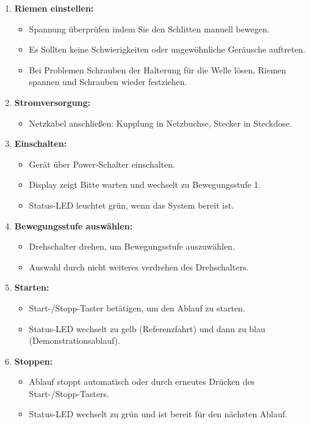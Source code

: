 \documentclass[12pt,a4paper]{scrbook}
\begin{document}
	\begin{enumerate}
		\item \textbf{Riemen einstellen:}
		\begin{itemize}
			\item Spannung überprüfen indem Sie den Schlitten manuell bewegen.
			\item Es Sollten keine Schwierigkeiten oder ungewöhnliche Geräusche auftreten.
			\item Bei Problemen Schrauben der Halterung für die Welle lösen, Riemen spannen und Schrauben wieder festziehen.
		\end{itemize}
		\item \textbf{Stromversorgung:}
		\begin{itemize}
			\item Netzkabel anschließen: Kupplung in Netzbuchse, Stecker in Steckdose.
		\end{itemize}
		\item \textbf{Einschalten:}
		\begin{itemize}
			\item Gerät über Power-Schalter einschalten.
			\item Display zeigt Bitte warten und wechselt zu Bewegungsstufe 1.
			\item Status-LED leuchtet grün, wenn das System bereit ist.
		\end{itemize}
		\item \textbf{Bewegungsstufe auswählen:}
		\begin{itemize}
			\item Drehschalter drehen, um Bewegungsstufe auszuwählen.
			\item Auswahl durch nicht weiteres verdrehen des Drehschalters.
		\end{itemize}
		\item \textbf{Starten:}
		\begin{itemize}
			\item Start-/Stopp-Taster betätigen, um den Ablauf zu starten.
			\item Status-LED wechselt zu gelb (Referenzfahrt) und dann zu blau (Demonstrationsablauf).
		\end{itemize}
		\item \textbf{Stoppen:}
		\begin{itemize}
			\item Ablauf stoppt automatisch oder durch erneutes Drücken des Start-/Stopp-Tasters.
			\item Status-LED wechselt zu grün und ist bereit für den nächsten Ablauf.
		\end{itemize}
	\end{enumerate}
	
\end{document}
